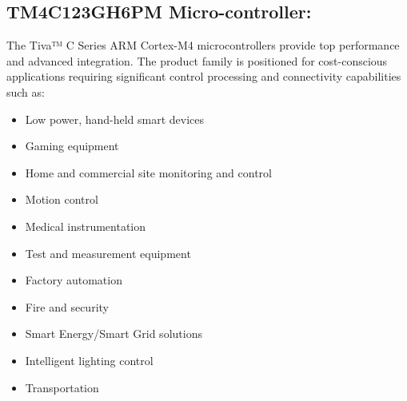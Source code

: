 \documentclass[a4paper,10pt,oneside]{article}
\begin{document}
{	\subsection{\huge \textbf{TM4C123GH6PM Micro-controller:}}
	{The Tiva™ C Series ARM Cortex-M4 microcontrollers provide top performance and advanced
		integration. The product family is positioned for cost-conscious applications requiring significant
		control processing and connectivity capabilities such as:
		\begin{itemize}
		\item Low power, hand-held smart devices
		\item Gaming equipment
		\item Home and commercial site monitoring and control
		\item Motion control
		\item Medical instrumentation
		\item Test and measurement equipment
		\item	Factory automation
		\item Fire and security
		\item  Smart Energy/Smart Grid solutions
		\item Intelligent lighting control
		\item Transportation
	\end{itemize}
}}
\end{document}
